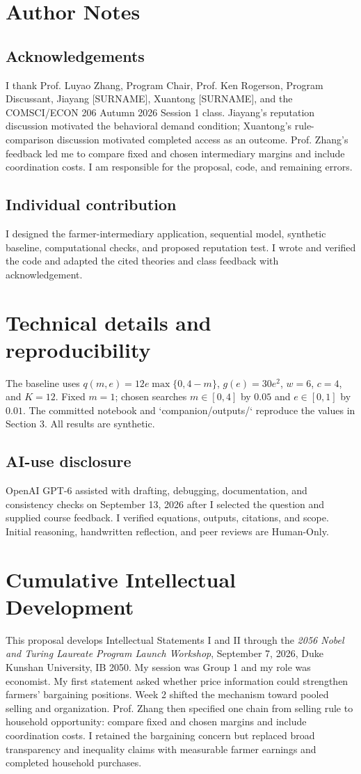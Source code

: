 \clearpage\nobalance
\section*{Author Notes}
\subsection*{Acknowledgements}
I thank Prof. Luyao Zhang, Program Chair, Prof. Ken Rogerson, Program Discussant, Jiayang [SURNAME], Xuantong [SURNAME], and the COMSCI/ECON 206 Autumn 2026 Session 1 class. Jiayang's reputation discussion motivated the behavioral demand condition; Xuantong's rule-comparison discussion motivated completed access as an outcome. Prof. Zhang's feedback led me to compare fixed and chosen intermediary margins and include coordination costs. I am responsible for the proposal, code, and remaining errors.
\subsection*{Individual contribution}
I designed the farmer-intermediary application, sequential model, synthetic baseline, computational checks, and proposed reputation test. I wrote and verified the code and adapted the cited theories and class feedback with acknowledgement.

\appendix
\section{Technical details and reproducibility}
The baseline uses $q(m,e)=12e\max\{0,4-m\}$, $g(e)=30e^2$, $w=6$, $c=4$, and $K=12$. Fixed $m=1$; chosen searches $m\in[0,4]$ by $0.05$ and $e\in[0,1]$ by $0.01$. The committed notebook and `companion/outputs/` reproduce the values in Section 3. All results are synthetic.
\subsection{AI-use disclosure}
OpenAI GPT-6 assisted with drafting, debugging, documentation, and consistency checks on September 13, 2026 after I selected the question and supplied course feedback. I verified equations, outputs, citations, and scope. Initial reasoning, handwritten reflection, and peer reviews are Human-Only.
\section{Cumulative Intellectual Development}
This proposal develops Intellectual Statements I and II through the \emph{2056 Nobel and Turing Laureate Program Launch Workshop}, September 7, 2026, Duke Kunshan University, IB 2050. My session was Group 1 and my role was economist. My first statement asked whether price information could strengthen farmers' bargaining positions. Week 2 shifted the mechanism toward pooled selling and organization. Prof. Zhang then specified one chain from selling rule to household opportunity: compare fixed and chosen margins and include coordination costs. I retained the bargaining concern but replaced broad transparency and inequality claims with measurable farmer earnings and completed household purchases.
